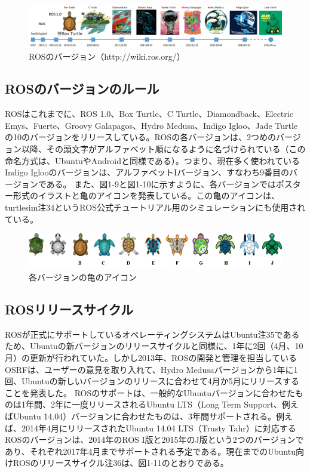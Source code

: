 \begin{figure}[h]
  \centering
  \includegraphics[width=\columnwidth]{pictures/chapter1/pic_01_05.png}
  \caption{ROSのバージョン（http://wiki.ros.org/）}
\end{figure}

\subsection{ROSのバージョンのルール}

ROSはこれまでに、ROS 1.0、Box Turtle、C Turtle、Diamondback、Electric Emys、Fuerte、Groovy Galapagos、Hydro Medusa、Indigo Igloo、Jade Turtleの10のバージョンをリリースしている。ROSの各バージョンは、2つめのバージョン以降、その頭文字がアルファベット順になるように名づけられている（この命名方式は、UbuntuやAndroidと同様である）。つまり、現在多く使われているIndigo Iglooのバージョンは、アルファベットIバージョン、すなわち9番目のバージョンである。
また、図1-9と図1-10に示すように、各バージョンではポスター形式のイラストと亀のアイコンを発表している。この亀のアイコンは、turtlesim注34というROS公式チュートリアル用のシミュレーションにも使用されている。

\begin{figure}[h]
  \centering
  \includegraphics[width=\columnwidth]{pictures/chapter1/pic_01_06.png}
  \caption{各バージョンの亀のアイコン}
\end{figure}

\subsection{ROSリリースサイクル}

ROSが正式にサポートしているオペレーティングシステムはUbuntu注35であるため、Ubuntuの新バージョンのリリースサイクルと同様に、1年に2回（4月、10月）の更新が行われていた。しかし2013年、ROSの開発と管理を担当しているOSRFは、ユーザーの意見を取り入れて、Hydro Medusaバージョンから1年に1回、Ubuntuの新しいバージョンのリリースに合わせて4月か5月にリリースすることを発表した。
ROSのサポートは、一般的なUbuntuバージョンに合わせたものは1年間、2年に一度リリースされるUbuntu LTS（Long Term Support、例えばUbuntu 14.04）バージョンに合わせたものは、3年間サポートされる。例えば、2014年4月にリリースされたUbuntu 14.04 LTS（Trusty Tahr）に対応するROSのバージョンは、2014年のROS I版と2015年のJ版という2つのバージョンであり、それぞれ2017年4月までサポートされる予定である。現在までのUbuntu向けROSのリリースサイクル注36は、図1-11のとおりである。\\

